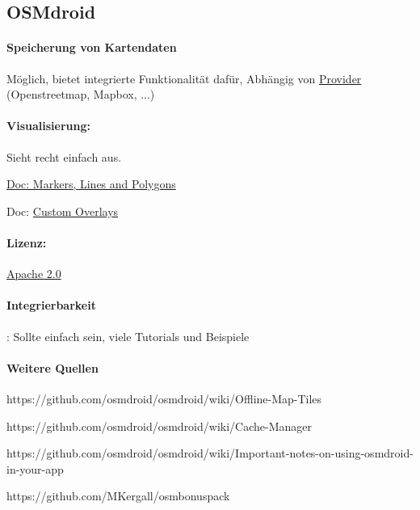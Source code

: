 \documentclass[11pt]{article} %
\begin{document}
\subsection{OSMdroid}

\paragraph{Speicherung von Kartendaten} Möglich, bietet integrierte Funktionalität dafür, Abhängig von \href{https://github.com/osmdroid/osmdroid/wiki/Modular-Tile-Provider-Architecture}{Provider} (Openstreetmap, Mapbox, ...)

\paragraph{Visualisierung:} Sieht recht einfach aus. 
\begin{cptitemize} 
 	 \item  \href{https://github.com/osmdroid/osmdroid/wiki/Markers,-Lines-and-Polygons}{Doc: Markers, Lines and Polygons}
 	 \item Doc: \href{https://github.com/osmdroid/osmdroid/wiki/Making-Custom-Overlays}{Custom Overlays}
\end{cptitemize}  

\paragraph{Lizenz:} \href{https://github.com/osmdroid/osmdroid/blob/master/LICENSE}{Apache 2.0} 

\paragraph{Integrierbarkeit}: Sollte einfach sein, viele Tutorials und Beispiele

\paragraph{Weitere Quellen} 
\begin{cptitemize} 
	\item https://github.com/osmdroid/osmdroid/wiki/Offline-Map-Tiles
 	 \item  https://github.com/osmdroid/osmdroid/wiki/Cache-Manager
 	 \item https://github.com/osmdroid/osmdroid/wiki/Important-notes-on-using-osmdroid-in-your-app
 	 \item https://github.com/MKergall/osmbonuspack
\end{cptitemize} 
\end{document}
